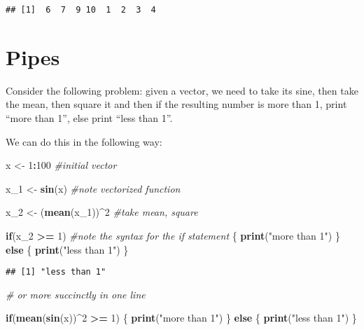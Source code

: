 \documentclass[11pt,]{article}
\newenvironment{Shaded}{\begin{snugshade}}{\end{snugshade}}
\newcommand{\KeywordTok}[1]{\textcolor[rgb]{0.13,0.29,0.53}{\textbf{#1}}}
\newcommand{\DecValTok}[1]{\textcolor[rgb]{0.00,0.00,0.81}{#1}}
\newcommand{\StringTok}[1]{\textcolor[rgb]{0.31,0.60,0.02}{#1}}
\newcommand{\CommentTok}[1]{\textcolor[rgb]{0.56,0.35,0.01}{\textit{#1}}}
\newcommand{\ControlFlowTok}[1]{\textcolor[rgb]{0.13,0.29,0.53}{\textbf{#1}}}
\newcommand{\OperatorTok}[1]{\textcolor[rgb]{0.81,0.36,0.00}{\textbf{#1}}}
\newcommand{\NormalTok}[1]{#1}
\begin{document}
\begin{verbatim}
## [1]  6  7  9 10  1  2  3  4
\end{verbatim}

\section{Pipes}\label{pipes}

Consider the following problem: given a vector, we need to take its
sine, then take the mean, then square it and then if the resulting
number is more than 1, print ``more than 1'', else print ``less than
1''.

We can do this in the following way:

\begin{Shaded}
\begin{Highlighting}[]
\NormalTok{x <-}\StringTok{ }\DecValTok{1}\OperatorTok{:}\DecValTok{100} \CommentTok{#initial vector}

\NormalTok{x_}\DecValTok{1}\NormalTok{ <-}\StringTok{ }\KeywordTok{sin}\NormalTok{(x) }\CommentTok{#note vectorized function}

\NormalTok{x_}\DecValTok{2}\NormalTok{ <-}\StringTok{ }\NormalTok{(}\KeywordTok{mean}\NormalTok{(x_}\DecValTok{1}\NormalTok{))}\OperatorTok{^}\DecValTok{2} \CommentTok{#take mean, square}

\ControlFlowTok{if}\NormalTok{(x_}\DecValTok{2} \OperatorTok{>=}\StringTok{ }\DecValTok{1}\NormalTok{) }\CommentTok{#note the syntax for the if statement}
\NormalTok{\{}
  \KeywordTok{print}\NormalTok{(}\StringTok{"more than 1"}\NormalTok{)}
\NormalTok{\} }\ControlFlowTok{else}
\NormalTok{\{}
  \KeywordTok{print}\NormalTok{(}\StringTok{"less than 1"}\NormalTok{)}
\NormalTok{\}}
\end{Highlighting}
\end{Shaded}

\begin{verbatim}
## [1] "less than 1"
\end{verbatim}

\begin{Shaded}
\begin{Highlighting}[]
\CommentTok{# or more succinctly in one line}

\ControlFlowTok{if}\NormalTok{(}\KeywordTok{mean}\NormalTok{(}\KeywordTok{sin}\NormalTok{(x))}\OperatorTok{^}\DecValTok{2} \OperatorTok{>=}\StringTok{ }\DecValTok{1}\NormalTok{)}
\NormalTok{\{}
  \KeywordTok{print}\NormalTok{(}\StringTok{"more than 1"}\NormalTok{)}
\NormalTok{\} }\ControlFlowTok{else}
\NormalTok{\{}
  \KeywordTok{print}\NormalTok{(}\StringTok{"less than 1"}\NormalTok{)}
\NormalTok{\}}
\end{Highlighting}
\end{Shaded}
\end{document}
